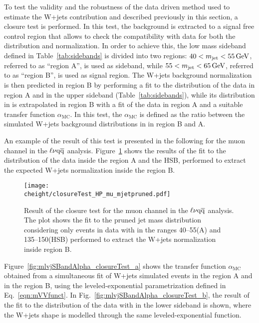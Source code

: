 To test the validity and the robustness of the data driven method used to estimate the W+jets contribution and described previously in this section, a closure test is performed.
In this test, the background is extracted to a signal free control region that allows to check the compatibility with data for both the distribution and normalization.
In order to achieve this, the low mass sideband defined in Table~\ref{tab:sidebands} is divided into two regions:
$40 < m_{\text{jet}} < 55\,\text{Ge\hspace{-.08em}V}$, referred to as ``region A'', is used as sideband, while $55 < m_{\text{jet}} < 65\,\text{Ge\hspace{-.08em}V}$, referred to as ``region B'', is used as signal region.
The W+jets background normalization is then predicted in region B by performing a fit to the \mJ distribution of the data in region A and in the upper sideband (Table~\ref{tab:sidebands}),
while its distribution in \mlvj is extrapolated in region B with a fit of the data in region A and a suitable transfer function $\alpha_\mathrm{MC}$.
In this test, the $\alpha_\mathrm{MC}$ is defined as the ratio between the simulated W+jets background distributions in \mlvj in region B and A.

An example of the result of this test is presented in the following for the muon channel in the $\ell\nu\mathrm{q}\overline{\mathrm{q}}$ analysis.
Figure~\ref{fig:mj_closureTest} shows the results of the fit to the \mJ distribution of the data inside the region A and the HSB, performed to extract the expected W+jets normalization inside the region B.

\begin{figure}[!htb]
\centering
\texttt{[image: \\cheight/closureTest\_HP\_mu\_mjetpruned.pdf]}
\caption{Result of the closure test for the muon channel in the $\ell\nu\mathrm{q}\overline{\mathrm{q}}$ analysis. The plot shows the fit to the pruned jet mass distribution considering only events in data with \mJ in the ranges 40--55\GeV (A) and 135--150\GeV (HSB) performed to extract the W+jets normalization inside region B.}
\label{fig:mj_closureTest}
\end{figure}

Figure~\ref{fig:mlvjSBandAlpha_closureTest_a} shows the transfer function $\alpha_\mathrm{MC}$ obtained from a simultaneous fit of W+jets simulated events in the region A and in the region B, using the leveled-exponential parametrization defined in Eq.~\ref{eqn:mVVfunct}. In Fig.~\ref{fig:mlvjSBandAlpha_closureTest_b}, the result of the fit to the \mlvj distribution of the data with \mJ in the lower sideband is shown, where the W+jets shape is modelled through the same leveled-exponential function.

